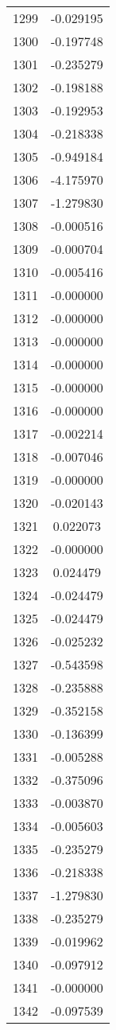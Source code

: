 \documentclass[12pt]{article}
\begin{document}
\begin{longtable}{@{}cc@{}}
1299 & -0.029195 \\
1300 & -0.197748 \\
1301 & -0.235279 \\
1302 & -0.198188 \\
1303 & -0.192953 \\
1304 & -0.218338 \\
1305 & -0.949184 \\
1306 & -4.175970 \\
1307 & -1.279830 \\
1308 & -0.000516 \\
1309 & -0.000704 \\
1310 & -0.005416 \\
1311 & -0.000000 \\
1312 & -0.000000 \\
1313 & -0.000000 \\
1314 & -0.000000 \\
1315 & -0.000000 \\
1316 & -0.000000 \\
1317 & -0.002214 \\
1318 & -0.007046 \\
1319 & -0.000000 \\
1320 & -0.020143 \\
1321 & 0.022073 \\
1322 & -0.000000 \\
1323 & 0.024479 \\
1324 & -0.024479 \\
1325 & -0.024479 \\
1326 & -0.025232 \\
1327 & -0.543598 \\
1328 & -0.235888 \\
1329 & -0.352158 \\
1330 & -0.136399 \\
1331 & -0.005288 \\
1332 & -0.375096 \\
1333 & -0.003870 \\
1334 & -0.005603 \\
1335 & -0.235279 \\
1336 & -0.218338 \\
1337 & -1.279830 \\
1338 & -0.235279 \\
1339 & -0.019962 \\
1340 & -0.097912 \\
1341 & -0.000000 \\
1342 & -0.097539 \\

\end{longtable}
\end{document}
